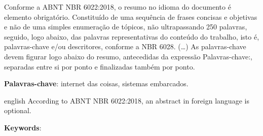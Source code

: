 \documentclass[
	article,			%
	12pt,				%
	oneside,			%
	a4paper,			%
	english,			%
	brazil,				%
	sumario=tradicional
	]{abntex2}
\begin{document}

\frenchspacing 


%
%

\maketitle



\begin{resumoumacoluna}
 Conforme a ABNT NBR 6022:2018, o resumo no idioma do documento é elemento obrigatório. 
 Constituído de uma sequência de frases concisas e objetivas e não de uma 
 simples enumeração de tópicos, não ultrapassando 250 palavras, seguido, logo 
 abaixo, das palavras representativas do conteúdo do trabalho, isto é, 
 palavras-chave e/ou descritores, conforme a NBR 6028. (\ldots) As 
 palavras-chave devem figurar logo abaixo do resumo, antecedidas da expressão 
 Palavras-chave:, separadas entre si por ponto e finalizadas também por ponto.
 
 \vspace{\onelineskip}
 
 \noindent
 \textbf{Palavras-chave}: internet das coisas, sistemas embarcados.
\end{resumoumacoluna}


\renewcommand{\resumoname}{Abstract}
\begin{resumoumacoluna}
 \begin{otherlanguage*}{english}
   According to ABNT NBR 6022:2018, an abstract in foreign language is optional.

   \vspace{\onelineskip}
 
   \noindent
   \textbf{Keywords}: 
 \end{otherlanguage*}  
\end{resumoumacoluna}
\end{document}
